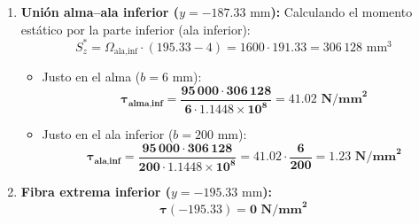 {\begin{enumerate}
              \begin{equation}
                  \mathbf{\tau_{\text{máx}} = \frac{95\,000 \cdot 411\,428}{6 \cdot 1.1448 \times 10^8} = \mathbf{55.13\text{ N/mm}^2}}
              \end{equation}
        \item \textbf{Unión alma--ala inferior ($y = -187.33\text{ mm}$):}
              Calculando el momento estático por la parte inferior (ala inferior):
              \begin{equation}
                  S_z^* = \Omega_{\text{ala,inf}} \cdot (195.33 - 4) = 1600 \cdot 191.33 = 306\,128\text{ mm}^3
              \end{equation}
              \begin{itemize}
                  \item Justo en el alma ($b = 6\text{ mm}$):
                        \begin{equation}
                            \mathbf{\tau_{\text{alma,inf}} = \frac{95\,000 \cdot 306\,128}{6 \cdot 1.1448 \times 10^8} = \mathbf{41.02\text{ N/mm}^2}}
                        \end{equation}
                  \item Justo en el ala inferior ($b = 200\text{ mm}$):
                        \begin{equation}
                            \mathbf{\tau_{\text{ala,inf}} = \frac{95\,000 \cdot 306\,128}{200 \cdot 1.1448 \times 10^8} = 41.02 \cdot \frac{6}{200} = \mathbf{1.23\text{ N/mm}^2}}
                        \end{equation}
              \end{itemize}
        \item \textbf{Fibra extrema inferior ($y = -195.33\text{ mm}$):}
              \begin{equation}
                  \mathbf{\tau(-195.33) = 0\text{ N/mm}^2}
              \end{equation}
    \end{enumerate}

    \begin{center}
\end{center}}
